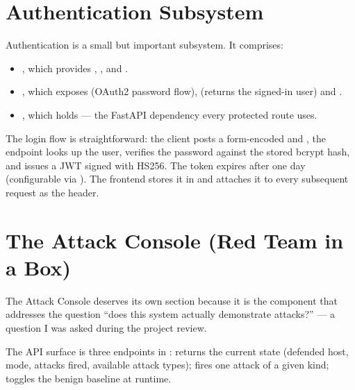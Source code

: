 \section{Authentication Subsystem}
\label{sec:design-auth}

Authentication is a small but important subsystem. It comprises:

\begin{itemize}
  \item {}, which provides
    , ,
     and .
  \item {}, which exposes
     (OAuth2 password flow),
     (returns the signed-in user) and
    .
  \item {}, which holds
     --- the FastAPI dependency every
    protected route uses.
\end{itemize}

The login flow is straightforward: the client posts a form-encoded
 and , the endpoint looks up the
user, verifies the password against the stored bcrypt hash, and
issues a JWT signed with HS256. The token expires after one day
(configurable via ). The
frontend stores it in  and attaches it to
every subsequent request as the
 header.

\section{The Attack Console (Red Team in a Box)}
\label{sec:design-attack-console}

The Attack Console deserves its own section because it is the
component that addresses the question ``does this system actually
demonstrate attacks?'' --- a question I was asked during the
project review.

The API surface is three endpoints in
:
 returns the current state (defended
host, mode, attacks fired, available attack types);
 fires one attack of a given kind;
 toggles the benign baseline at
runtime.

